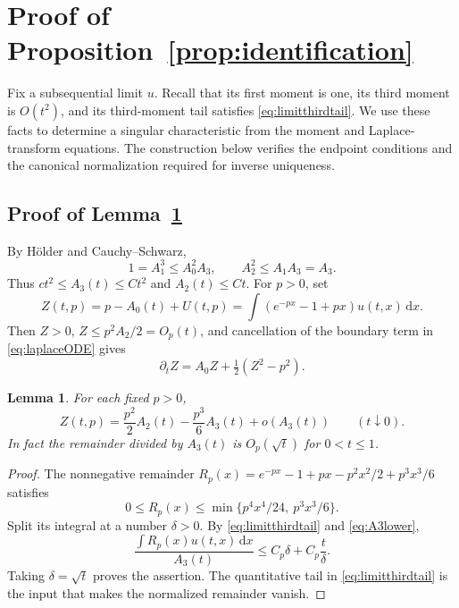 \documentclass[11pt,letterpaper,reqno]{amsart}
\theoremstyle{plain}
\newtheorem{lemma}[theorem]{Lemma}
\newcommand{\dd}{\,\mathrm d}
\begin{document}
\section{Proof of Proposition~\ref{prop:identification}}\label{sec:rigidity}
Fix a subsequential limit $u$. Recall that its first moment is one, its third moment is $O(t^2)$, and its third-moment tail satisfies \eqref{eq:limitthirdtail}. We use these facts to determine a singular characteristic from the moment and Laplace-transform equations. The construction below verifies the endpoint conditions and the canonical normalization required for inverse uniqueness.

\subsection{Proof of Lemma~\ref{lem:remainder}}
By H\"older and Cauchy--Schwarz,
\begin{equation}\label{eq:A3lower}
 1=A_1^3\le A_0^2A_3,\qquad A_2^2\le A_1A_3=A_3.
\end{equation}
Thus $ct^2\le A_3(t)\le Ct^2$ and $A_2(t)\le Ct$. For $p>0$, set
\[
 Z(t,p)=p-A_0(t)+U(t,p)=\int(e^{-px}-1+px)u(t,x)\dd x.
\]
Then $Z>0$, $Z\le p^2A_2/2=O_p(t)$, and cancellation of the boundary term in \eqref{eq:laplaceODE} gives
\begin{equation}\label{eq:ZODE}
 \partial_tZ=A_0Z+\tfrac12(Z^2-p^2).
\end{equation}

\begin{lemma}\label{lem:remainder}
For each fixed $p>0$,
\begin{equation}\label{eq:taylorthird}
 Z(t,p)=\frac{p^2}{2}A_2(t)-\frac{p^3}{6}A_3(t)+o(A_3(t))\qquad(t\downarrow0).
\end{equation}
In fact the remainder divided by $A_3(t)$ is $O_p(\sqrt t)$ for $0<t\le1$.
\end{lemma}
\begin{proof}
The nonnegative remainder
$R_p(x)=e^{-px}-1+px-p^2x^2/2+p^3x^3/6$ satisfies
\[
 0\le R_p(x)\le \min\{p^4x^4/24,\ p^3x^3/6\}.
\]
Split its integral at a number $\delta>0$. By \eqref{eq:limitthirdtail} and \eqref{eq:A3lower},
\[
 \frac{\int R_p(x)u(t,x)\dd x}{A_3(t)}
 \le C_p\delta+C_p\frac{t}{\delta}.
\]
Taking $\delta=\sqrt t$ proves the assertion. The quantitative tail in \eqref{eq:limitthirdtail} is the input that makes the normalized remainder vanish.
\end{proof}
\end{document}
